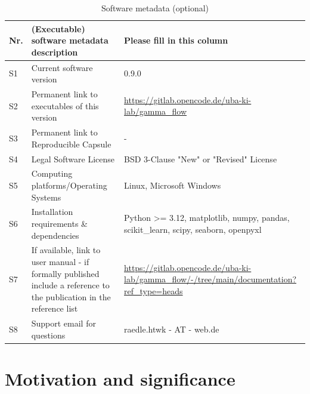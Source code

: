\documentclass[preprint, 12pt, a4paper]{elsarticle}
\begin{document}
\begin{table}[!ht]
\begin{tabular}{|l|p{6.5cm}|p{6.5cm}|}
\hline
\textbf{Nr.} & \textbf{(Executable) software metadata description} & \textbf{Please fill in this column} \\
\hline
S1 & Current software version & 0.9.0 \\
\hline
S2 & Permanent link to executables of this version  & \url{https://gitlab.opencode.de/uba-ki-lab/gamma_flow} \\
\hline
S3  & Permanent link to Reproducible Capsule & - \\
\hline
S4 & Legal Software License & BSD 3-Clause "New" or "Revised" License \\
\hline
S5 & Computing platforms/Operating Systems & Linux, Microsoft Windows\\
\hline
S6 & Installation requirements \& dependencies & Python >= 3.12, matplotlib, numpy, pandas, scikit\_learn, scipy, seaborn, openpyxl \\
\hline
S7 & If available, link to user manual - if formally published include a reference to the publication in the reference list &  \url{https://gitlab.opencode.de/uba-ki-lab/gamma_flow/-/tree/main/documentation?ref_type=heads} \\
\hline
S8 & Support email for questions & raedle.htwk - AT - web.de\\
\hline
\end{tabular}
\caption{Software metadata (optional)}
\label{executabelMetadata} 
\end{table}


\section{Motivation and significance}
\end{document}
